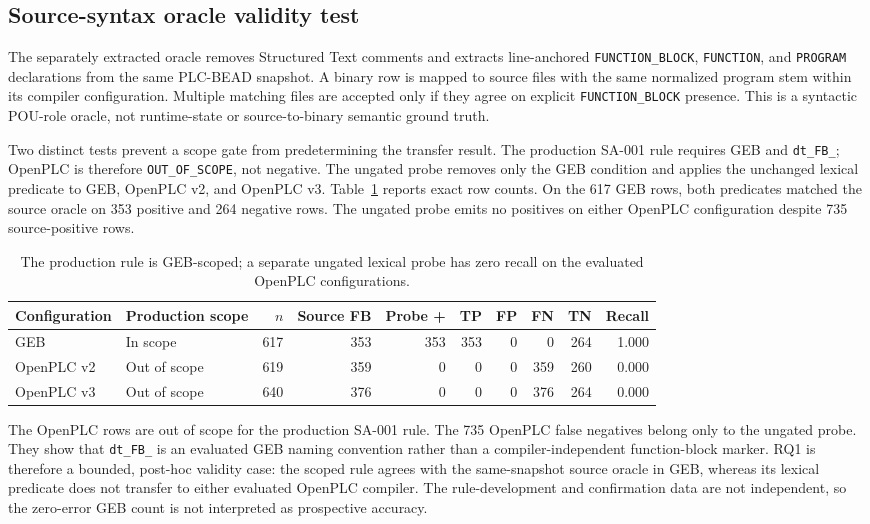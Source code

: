 \documentclass[manuscript,screen,review]{acmart}
\begin{document}
\subsection{Source-syntax oracle validity test}
\label{sec:source_oracle}

The separately extracted oracle removes Structured Text comments and extracts line-anchored \texttt{FUNCTION\_BLOCK}, \texttt{FUNCTION}, and \texttt{PROGRAM} declarations from the same PLC-BEAD snapshot. A binary row is mapped to source files with the same normalized program stem within its compiler configuration. Multiple matching files are accepted only if they agree on explicit \texttt{FUNCTION\_BLOCK} presence. This is a syntactic POU-role oracle, not runtime-state or source-to-binary semantic ground truth.

Two distinct tests prevent a scope gate from predetermining the transfer result. The production SA-001 rule requires GEB and \texttt{dt\_FB\_}; OpenPLC is therefore \texttt{OUT\_OF\_SCOPE}, not negative. The ungated probe removes only the GEB condition and applies the unchanged lexical predicate to GEB, OpenPLC v2, and OpenPLC v3. Table~\ref{tab:source_oracle} reports exact row counts. On the 617 GEB rows, both predicates matched the source oracle on 353 positive and 264 negative rows. The ungated probe emits no positives on either OpenPLC configuration despite 735 source-positive rows.

\begin{table}[t]
\centering
\small
\caption{The production rule is GEB-scoped; a separate ungated lexical probe has zero recall on the evaluated OpenPLC configurations.}
\label{tab:source_oracle}
\begin{tabularx}{\textwidth}{>{\raggedright\arraybackslash}X>{\raggedright\arraybackslash}p{}rrrrrrrr}
\toprule
Configuration & Production scope & $n$ & Source FB & Probe + & TP & FP & FN & TN & Recall \\
\midrule
GEB & In scope & 617 & 353 & 353 & 353 & 0 & 0 & 264 & 1.000 \\
OpenPLC v2 & Out of scope & 619 & 359 & 0 & 0 & 0 & 359 & 260 & 0.000 \\
OpenPLC v3 & Out of scope & 640 & 376 & 0 & 0 & 0 & 376 & 264 & 0.000 \\
\bottomrule
\end{tabularx}
\end{table}

The OpenPLC rows are out of scope for the production SA-001 rule. The 735 OpenPLC false negatives belong only to the ungated probe. They show that \texttt{dt\_FB\_} is an evaluated GEB naming convention rather than a compiler-independent function-block marker. RQ1 is therefore a bounded, post-hoc validity case: the scoped rule agrees with the same-snapshot source oracle in GEB, whereas its lexical predicate does not transfer to either evaluated OpenPLC compiler. The rule-development and confirmation data are not independent, so the zero-error GEB count is not interpreted as prospective accuracy.
\end{document}

